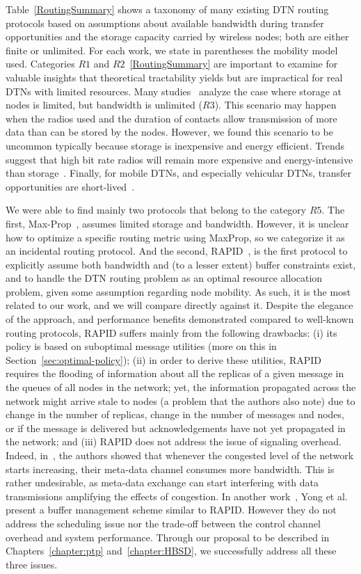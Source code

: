 Table~\ref{RoutingSummary} shows a taxonomy of many existing DTN routing protocols based on assumptions about available bandwidth during transfer opportunities and the storage
capacity carried by wireless nodes; both are either finite or unlimited. For each work, we state in parentheses the mobility model used. 
Categories $R1$ and $R2$~\ref{RoutingSummary} are important to examine for valuable insights that theoretical tractability yields but are impractical for real DTNs with limited resources. Many studies~\cite{Lindgren:probabilistic,Wearable,MVRouting} analyze the case where storage at nodes is limited, but bandwidth is unlimited ($R3$). This scenario may happen when the radios used and the duration of contacts allow
transmission of more data than can be stored by the nodes. However, we found this scenario to be uncommon typically because storage is inexpensive and energy efficient. Trends suggest that high bit rate radios will remain more expensive and energy-intensive than storage~\cite{PRESTO}. Finally, for mobile DTNs, and especially vehicular DTNs, transfer opportunities are short-lived~\cite{Levine:MaxProp}.

We were able to find mainly two protocols that belong to the category $R5$. The first, Max-Prop~\cite{Levine:MaxProp}, assumes limited storage and bandwidth. However, it is unclear how to optimize a specific routing metric using MaxProp, so we categorize it as an incidental routing protocol. And the second, RAPID~\cite{BalasubramanianLV07}, is the first protocol to explicitly assume both bandwidth and (to a lesser extent) buffer constraints exist, and to handle the DTN routing problem as an optimal resource allocation problem, given some assumption regarding node mobility. As such, it is the most related to our work, and we will compare  directly against it. Despite the elegance of the approach, and performance benefits demonstrated compared to well-known routing protocols, RAPID suffers mainly from the following drawbacks: (i) its policy is based on suboptimal message utilities (more on this in Section~\ref{sec:optimal-policy}); (ii) in order to derive these utilities, RAPID requires the flooding of information about all the replicas of a given message in the queues of all nodes in the network; yet, the information propagated across the network might arrive stale to nodes (a problem that the authors also note) due to change in the number of replicas, change in the number of messages and nodes, or if the message is delivered but acknowledgements have not yet propagated in the network; and (iii) RAPID does not address the issue of signaling overhead. Indeed, in~\cite{Levine:Sigcomm07}, the authors showed that whenever the congested level of the network starts increasing, their meta-data channel consumes more bandwidth. This is rather undesirable, as meta-data exchange can start interfering with data transmissions amplifying the effects of congestion. In another work~\cite{AOBM}, Yong et al. present a buffer management scheme similar to RAPID. However they do not address the scheduling issue nor the trade-off between the control channel overhead and system performance. Through our proposal to be described in Chapters~\ref{chapter:ptp} and~\ref{chapter:HBSD}, we successfully address all these three issues.

